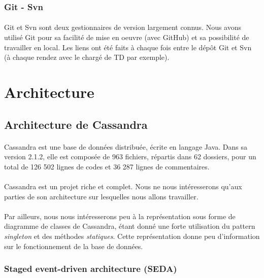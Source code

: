 \documentclass[12pt]{article}
\begin{document}
\subsubsection{Git - Svn}

\paragraph{}Git et Svn sont deux gestionnaires de version largement connus. Nous avons utilisé Git pour sa facilité de mise en oeuvre (avec GitHub) et sa possibilité de travailler en local. Les liens ont été faits à chaque fois entre le dépôt Git et Svn (à chaque rendez avec le chargé de TD par exemple).

\newpage

\section{Architecture}
\label{sec:Architecture}


\subsection{Architecture de Cassandra}

\paragraph{} Cassandra est une base de données distribuée, écrite en langage Java. Dans sa version 2.1.2, elle est composée de 963 fichiers, répartis dans 62 dossiers, pour un total de 126 502 lignes de codes et 36 287 lignes de commentaires.

\paragraph{} Cassandra est un projet riche et complet. Nous ne nous intéresserons qu'aux parties de son architecture sur lesquelles nous allons travailler.

\paragraph{} Par ailleurs, nous nous intéresserons peu à la représentation sous forme de diagramme de classes de Cassandra, étant donné une forte utilisation du pattern \textit{singleton} et des méthodes \textit{statiques}. Cette représentation donne peu d'information sur le fonctionnement de la base de données.

\subsubsection{Staged event-driven architecture (SEDA)}
\end{document}
